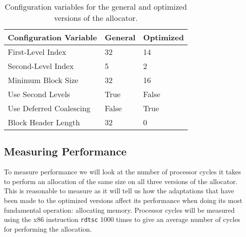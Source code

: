 

\begin{table}[H]
\centering
\begin{tabular}{lllll}
\hline
Configuration Variable  & General  & \multicolumn{3}{l}{Optimized} \\ \hline
First-Level Index       & 32       & \multicolumn{3}{l}{14}        \\
Second-Level Index      & 5        & \multicolumn{3}{l}{2}         \\
Minimum Block Size      & 32       & \multicolumn{3}{l}{16 }       \\
Use Second Levels       & True     & \multicolumn{3}{l}{False}     \\
Use Deferred Coalescing & False    & \multicolumn{3}{l}{True}      \\
Block Header Length     & 32       & \multicolumn{3}{l}{0}        
\end{tabular}
\caption{Configuration variables for the general and optimized versions of the allocator.}
\label{table:configuration-variables}
\end{table}

\subsection{Measuring Performance}

To measure performance we will look at the number of processor cycles it takes to perform an allocation of the same size on all three versions of the allocator. This is reasonable to measure as it will tell us how the adaptations that have been made to the optimized versions affect its performance when doing its most fundamental operation: allocating memory. Processor cycles will be measured using the x86 instruction \texttt{rdtsc} 1000 times to give an average number of cycles for performing the allocation. 

